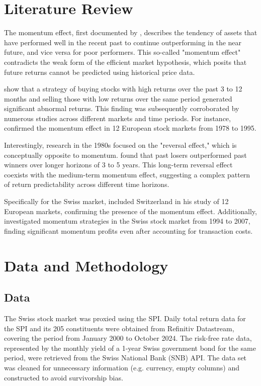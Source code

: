 \documentclass[a4paper,12pt]{article}
\begin{document}
\newpage

\section{Literature Review}
The momentum effect, first documented by \cite{jegatit1993}, describes the tendency of assets that have performed well in the recent past to continue outperforming in the near future, and vice versa for poor performers. This so-called "momentum effect" contradicts the weak form of the efficient market hypothesis, which posits that future returns cannot be predicted using historical price data. 

\cite{jegatit1993} show that a strategy of buying stocks with high returns over the past 3 to 12 months and selling those with low returns over the same period generated significant abnormal returns. This finding was subsequently corroborated by numerous studies across different markets and time periods. For instance, \cite{rouwenhorst1998} confirmed the momentum effect in 12 European stock markets from 1978 to 1995. 

Interestingly, research in the 1980s focused on the "reversal effect," which is conceptually opposite to momentum. \cite{debondt1987} found that past losers outperformed past winners over longer horizons of 3 to 5 years. This long-term reversal effect coexists with the medium-term momentum effect, suggesting a complex pattern of return predictability across different time horizons. 

Specifically for the Swiss market, \cite{rouwenhorst1998} included Switzerland in his study of 12 European markets, confirming the presence of the momentum effect. Additionally, \cite{ammann2008} investigated momentum strategies in the Swiss stock market from 1994 to 2007, finding significant momentum profits even after accounting for transaction costs.

\newpage
\section{Data and Methodology}
\subsection{Data}
The Swiss stock market was proxied using the SPI. Daily total return data for the SPI and its 205 constituents were obtained from Refinitiv Datastream, covering the period from January 2000 to October 2024. The risk-free rate data, represented by the monthly yield of a 1-year Swiss government bond for the same period, were retrieved from the Swiss National Bank (SNB) API. The data set was cleaned for unnecessary information (e.g. currency, empty columns) and constructed to avoid survivorship bias.
\end{document}
